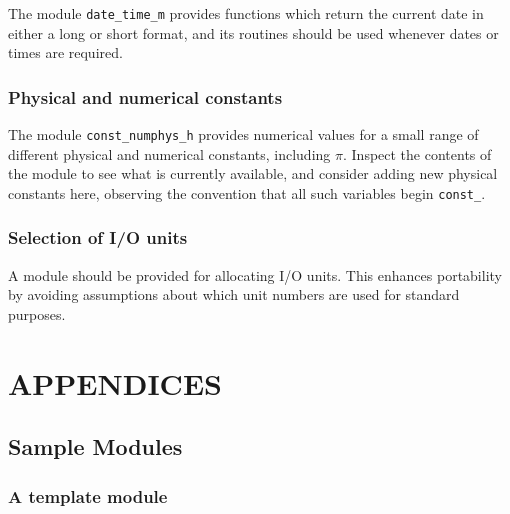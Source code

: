 \documentclass[11pt,twoside,a4paper]{report}
\begin{document}
The module \verb|date_time_m| provides functions which return the current
date in either a long or short format, and its routines should be used
whenever dates or times are required.

\section{Physical and numerical constants}
The module \verb|const_numphys_h| provides numerical values for a small
range of different physical and numerical constants, including $\pi$.
Inspect the contents of the module to see what is currently available,
and consider adding new physical constants here, observing the
convention that all such variables begin \verb|const_|.

\section{Selection of I/O units}

A module should be provided for allocating I/O units. This enhances
portability by avoiding assumptions about which unit numbers are used
for standard purposes.



\clearpage

%

%
%


%

\cleardoublepage
\appendix
{}

\part*{APPENDICES}
\chapter{Sample Modules}\label{sec:appa}

\section{A template module}
\label{sec:template}
\setlength{\oddsidemargin}{0.0mm}
\setlength{\evensidemargin}{\oddsidemargin}
\end{document}

